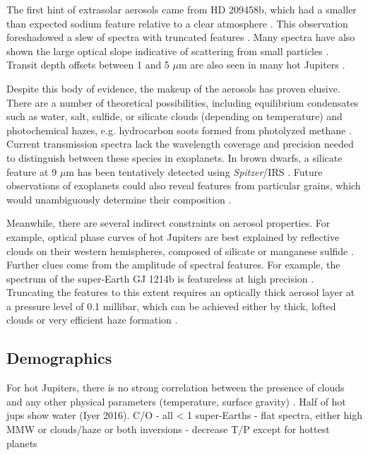 \documentclass[graybox,natbib,nosecnum]{svmult}
\newcommand{\project}[1]{\textsl{#1}}
\newcommand{\Spitzer}{\project{Spitzer}}
\begin{document}
The first hint of extrasolar aerosols came from HD 209458b, which had a smaller than expected sodium feature relative to a clear atmosphere \citep{charbonneau02}. This observation foreshadowed a slew of spectra with truncated features \citep[e.g.][]{deming13, crossfield13, kreidberg14a, knutson14a, kreidberg15b}. Many spectra have also shown the large optical slope indicative of scattering from small particles \citep[e.g][]{sing11, sing13, robinson14, dragomir15}. Transit depth offsets between 1 and 5 $\mu$m are also seen in many hot Jupiters \citep{sing16}.

Despite this body of evidence, the makeup of the aerosols has proven elusive. There are a number of theoretical possibilities, including equilibrium condensates such as water, salt, sulfide, or silicate clouds (depending on temperature) and photochemical hazes, e.g. hydrocarbon soots formed from photolyzed methane \citep{burrows99, kempton12, morley13, wakeford17}. Current transmission spectra lack the wavelength coverage and precision needed to distinguish between these species in exoplanets.  In brown dwarfs, a silicate feature at 9 $\mu$m has been tentatively detected using \Spitzer/IRS \citep{cushing06}. Future observations of exoplanets could also reveal features from particular grains, which would unambiguously determine their composition \citep{wakeford15}.

Meanwhile, there are several indirect constraints on aerosol properties.  For example, optical phase curves of hot Jupiters are best explained by reflective clouds on their western hemispheres, composed of silicate or manganese sulfide \citep{demory13, oreshenko16, parmentier16}. Further clues come from the amplitude of spectral features. For example, the spectrum of the super-Earth GJ 1214b is featureless at high precision \citep[30 ppm,][]{kreidberg14a}.  Truncating the features to this extent requires an optically thick aerosol layer at a pressure level of 0.1 millibar, which can be achieved either by thick, lofted clouds or very efficient haze formation \citep{morley15}.  

\subsection{Demographics}
For hot Jupiters, there is no strong correlation between the presence of clouds and any other physical parameters (temperature, surface gravity) \citep{sing16}. Half of hot jups show water (Iyer 2016).
C/O - all < 1
super-Earths - flat spectra, either high MMW or clouds/haze or both
inversions - decrease T/P except for hottest planets 
\end{document}
